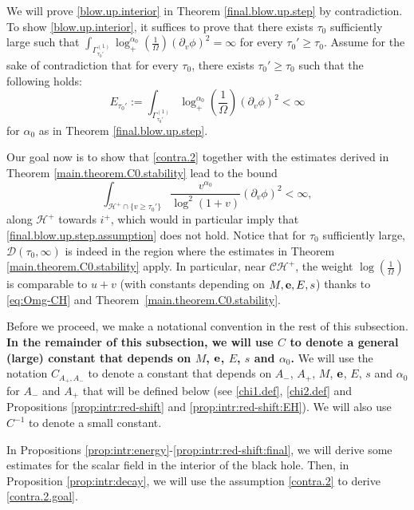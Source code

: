 \documentclass[10pt, reqno]{amsart}
\theoremstyle{definition}
\theoremstyle{remark}
\numberwithin{equation}{section}
\newcommand{\rd}{\partial}
\newcommand{\0}{\emptyset}
\newcommand{\alp}{\alpha}
\newcommand{\Gmm}{\Gamma}
\newcommand{\Omg}{\Omega}
\newcommand{\bfe}{{\bf e}}
\newcommand{\calC}{\mathcal C}
\newcommand{\calH}{\mathcal H}
\newcommand{\f}{\frac}
\newcommand{\CH}{\calC \calH^{+}}		%
\newcommand{\EH}{\calH^{+}}
\begin{document}
We will prove \eqref{blow.up.interior} in Theorem \ref{final.blow.up.step} by contradiction. To show \eqref{blow.up.interior}, it suffices to prove that there exists $\tau_0$ sufficiently large such that $\int_{\Gmm^{(1)}_{\tau_0'}} \log_+^{\alp_{0}}(\f{1}{\Omg}) (\rd_{v} \phi)^{2}=\infty$ for every $\tau_0'\geq \tau_0$. Assume for the sake of contradiction that for every $\tau_0$, there exists $\tau_0'\geq \tau_0$ such that the following holds:
\begin{equation} \label{contra.2}
	E_{\tau_0'}:=\int_{\Gmm^{(1)}_{\tau_0'}} \log_+^{\alp_{0}}(\f{1}{\Omg}) (\rd_{v} \phi)^{2} <\infty
\end{equation}
for $\alp_0$ as in Theorem \ref{final.blow.up.step}.

Our goal now is to show that \eqref{contra.2} together with the estimates derived in Theorem \ref{main.theorem.C0.stability} lead to the bound
\begin{equation}\label{contra.2.goal}
	\int_{\EH\cap\{v\geq \tau_0'\}} \f{v^{\alp_0}}{\log^2(1+v)} (\rd_{v} \phi)^{2} < \infty,
\end{equation}
along $\mathcal H^+$ towards $i^{+}$, which would in particular imply that \eqref{final.blow.up.step.assumption} does not hold. Notice that for $\tau_0$ sufficiently large, $\mathcal D(\tau_0,\infty)$ is indeed in the region where the estimates in Theorem \ref{main.theorem.C0.stability} apply. In particular, near $\CH$, the weight $\log (\frac{1}{\Omg})$ is comparable to $u+v$ (with constants depending on $M, \bfe, E, s$) thanks to \eqref{eq:Omg-CH} and Theorem~\ref{main.theorem.C0.stability}.

Before we proceed, we make a notational convention in the rest of this subsection. {\bf In the remainder of this subsection, we will use $C$ to denote a general (large) constant that depends on $M$, ${\bf e}$, $E$, $s$ and $\alp_0$.} We will use the notation $C_{A_+,A_-}$ to denote a constant that depends on $A_-$, $A_+$, $M$, ${\bf e}$, $E$, $s$ and $\alp_0$ for $A_-$ and $A_+$ that will be defined below (see \eqref{chi1.def}, \eqref{chi2.def} and Propositions \ref{prop:intr:red-shift} and \ref{prop:intr:red-shift:EH}). We will also use $C^{-1}$ to denote a small constant.

In Propositions \ref{prop:intr:energy}-\ref{prop:intr:red-shift:final}, we will derive some estimates for the scalar field in the interior of the black hole. Then, in Proposition \ref{prop:intr:decay}, we will use the assumption \eqref{contra.2} to derive \eqref{contra.2.goal}. 
\end{document}
